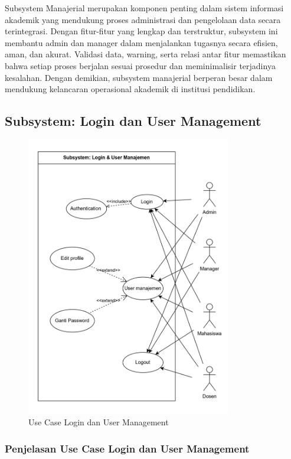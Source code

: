 \documentclass[a4paper,oneside,11pt]{book}
\begin{document}
Subsystem Manajerial merupakan komponen penting dalam sistem informasi akademik yang mendukung proses administrasi dan pengelolaan data secara terintegrasi. Dengan fitur-fitur yang lengkap dan terstruktur, subsystem ini membantu admin dan manager dalam menjalankan tugasnya secara efisien, aman, dan akurat. Validasi data, warning, serta relasi antar fitur memastikan bahwa setiap proses berjalan sesuai prosedur dan meminimalisir terjadinya kesalahan. Dengan demikian, subsystem manajerial berperan besar dalam mendukung kelancaran operasional akademik di institusi pendidikan.


\subsection{Subsystem: Login dan User Management}
\begin{figure}[H]
  \centering
  \includegraphics[width=0.8\textwidth]{USECASE/usecaselogin.jpg}
  \caption{Use Case Login dan User Management}
  \label{fig:use_case_login}
\end{figure}

\subsubsection{Penjelasan Use Case Login dan User Management}
\end{document}

